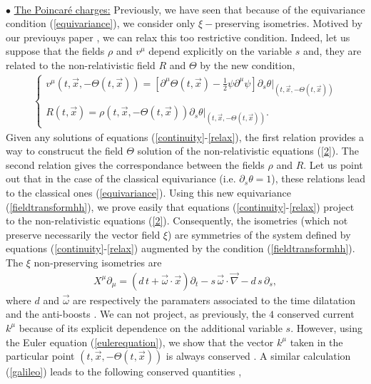 \documentclass[11pt,a4paper]{article}
\begin{document}
\\
$\bullet$ \underline{The Poincar\'e charges:} Previously, we have seen that because of the equivariance condition (\ref{equivariance}), we consider only $\xi-$preserving isometries. Motived by our previouys paper \cite{HH}, we can relax this too restrictive condition. Indeed, let us suppose that the fields $\rho$ and $v^\mu$ depend explicitly on the variable $s$ and, they are related to the non-relativistic field $R$ and $\Theta$ by the new condition,
\begin{eqnarray}
\left\lbrace
\begin{array}{l}
v^\mu\left(t,\vec{x},-\Theta(t,\vec{x})\right)=\left[\partial^\mu\Theta(t,\vec{x})-\frac{1}{2}\psi\partial^\mu\psi\right]\partial_s\theta\vert_{\left(t,\vec{x},-\Theta(t,\vec{x})\right)}\\
\\
R(t,\vec{x})=\rho\left(t,\vec{x},-\Theta(t,\vec{x})\right)
\partial_s\theta\vert_{\left(t,\vec{x},-\Theta(t,\vec{x})\right)}.
\label{fieldtransformhh}
\end{array}
\right.
\end{eqnarray}
Given any solutions of equations (\ref{continuity}-\ref{relax}), the first relation provides a way to construcut the field $\Theta$ solution of the non-relativistic equations (\ref{2}). The second relation gives the correspondance between the fields $\rho$ and $R$. Let us point out that in the case of the classical equivariance (i.e. $\partial_s\theta=1$), these relations lead to the classical ones (\ref{equivariance}). Using this new equivariance (\ref{fieldtransformhh}), we prove easily that equations (\ref{continuity}-\ref{relax}) project to the non-relativistic equations (\ref{2}). Consequently, the isometries (which not preserve necessarily the vector field $\xi$) are symmetries of the system defined by equations (\ref{continuity}-\ref{relax}) augmented by the condition (\ref{fieldtransformhh}). The $\xi$ non-preserving isometries are
\begin{eqnarray}
X^\mu\partial_\mu=(d\,t+\vec{\omega}\cdot\vec{x})\partial_t-s\,\vec{\omega}\cdot\vec{\nabla}-d\,s\,\partial_s,
\label{isometries''}
\end{eqnarray} 
where $d$ and $\vec{\omega}$ are respectively the paramaters associated to the time dilatation and the anti-boosts \cite{HH}. We can not project, as previously, the $4$ conserved current $k^\mu$ because of its explicit dependence on the additional variable $s$. However, using the Euler equation (\ref{eulerequation}), we show that the vector $k^\mu$ taken in the particular point $(t,\vec{x},-\Theta(t,\vec{x}))$ is always conserved \cite{HH}. A similar calculation (\ref{galileo}) leads to the following conserved quantities ,
\end{document}
